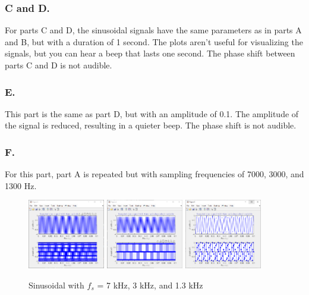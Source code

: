 \documentclass{article}
\begin{document}
\subsubsection*{C and D.}
For parts C and D, the sinusoidal signals have the same parameters as in parts A and B,
but with a duration of 1 second. The plots aren't useful for visualizing the signals,
but you can hear a beep that lasts one second. The phase shift between parts C and D
is not audible.


\subsubsection*{E.}
This part is the same as part D, but with an amplitude of 0.1. The amplitude of the
signal is reduced, resulting in a quieter beep. The phase shift is not audible.

\subsubsection*{F.}
For this part, part A is repeated but with sampling frequencies of 7000, 3000, and 
1300 Hz. 
\begin{figure}[H]
	\centering
	\includegraphics[width=0.3\textwidth]{fig 1f 7000.png}\hfill
	\includegraphics[width=0.3\textwidth]{fig 1f 3000.png}\hfill
	\includegraphics[width=0.3\textwidth]{fig 1f 1300.png}
	\caption{Sinusoidal with $f_s$ = 7 kHz, 3 kHz, and 1.3 kHz}
	\label{fig:fig3}
\end{figure}
\end{document}
